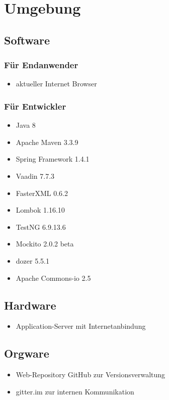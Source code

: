  
\chapter{Umgebung}
 
\section{Software}
\subsection {Für Endanwender}

\begin{itemize}
\item aktueller Internet Browser
\end{itemize}

\subsection	{Für Entwickler}

\begin{itemize}
\item Java 8
\item Apache Maven 3.3.9
\item Spring Framework 1.4.1
\item Vaadin 7.7.3
\item FasterXML 0.6.2
\item Lombok 1.16.10
\item TestNG 6.9.13.6
\item Mockito 2.0.2 beta
\item dozer 5.5.1
\item Apache Commons-io 2.5
\end{itemize}
 
\section{Hardware}

\begin{itemize}
\item Application-Server mit Internetanbindung
\end{itemize} 

\section{Orgware}
\begin{itemize}
\item Web-Repository GitHub zur Versionsverwaltung
\item gitter.im zur internen Kommunikation 
\end{itemize}
